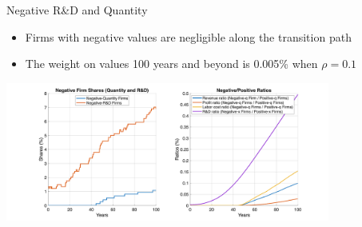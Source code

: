 \documentclass[
  10pt,
  aspectratio=169,   %
]{beamer}
\theoremstyle{plain}
\begin{document}
\begin{frame}{Negative R\&D and Quantity}
  \begin{itemize}
    \item Firms with negative values are negligible along the transition path
    \item The weight on values 100 years and beyond is 0.005\% when $\rho=0.1$
  \end{itemize}
  \begin{center}
    \includegraphics[width=0.8\textwidth]{figures/transition_path_analysis.png}
  \end{center}
  \hyperlink{hjb}{}
\end{frame}



\end{document}
